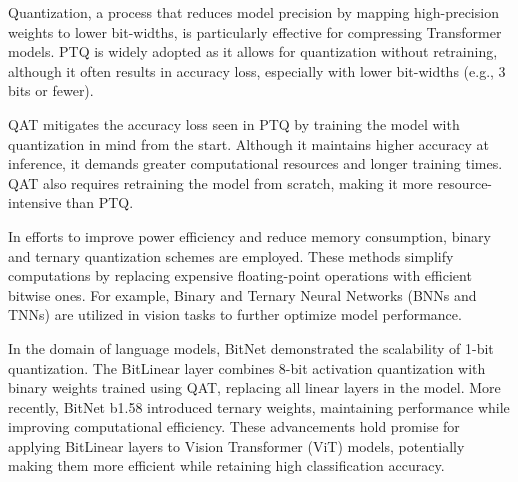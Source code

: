 \documentclass[conference]{IEEEtran}
\begin{document}
		Quantization, a process that reduces model precision by mapping high-precision weights to lower bit-widths, is particularly effective for compressing Transformer models. PTQ is widely adopted as it allows for quantization without retraining, although it often results in accuracy loss, especially with lower bit-widths (e.g., 3 bits or fewer).
		
		QAT mitigates the accuracy loss seen in PTQ by training the model with quantization in mind from the start. Although it maintains higher accuracy at inference, it demands greater computational resources and longer training times. QAT also requires retraining the model from scratch, making it more resource-intensive than PTQ.
		
		In efforts to improve power efficiency and reduce memory consumption, binary and ternary quantization schemes are employed. These methods simplify computations by replacing expensive floating-point operations with efficient bitwise ones. For example, Binary and Ternary Neural Networks (BNNs and TNNs) are utilized in vision tasks to further optimize model performance.
		
		In the domain of language models, BitNet demonstrated the scalability of 1-bit quantization. The BitLinear layer combines 8-bit activation quantization with binary weights trained using QAT, replacing all linear layers in the model. More recently, BitNet b1.58 introduced ternary weights, maintaining performance while improving computational efficiency. These advancements hold promise for applying BitLinear layers to Vision Transformer (ViT) models, potentially making them more efficient while retaining high classification accuracy.
		
		
		
		
		
		
		
		
		
		
\end{document}
